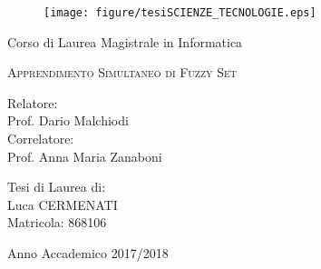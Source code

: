 \documentclass [11pt,a4paper,twoside,openright] {book}
\begin{document}
\begin{titlepage}
\begin{figure}
\centering
\texttt{[image: figure/tesiSCIENZE\_TECNOLOGIE.eps]}
\vspace{0.5 cm}
\end{figure}
\begin{center}
{\LARGE Corso di Laurea Magistrale in Informatica}
\end{center}
\begin{center}
\vspace{2 cm}
{\Large \textsc{Apprendimento Simultaneo di Fuzzy Set} }
\end{center}
\par
\vspace{2 cm}
\begin{flushleft}
Relatore:\\ Prof. Dario Malchiodi\\
\noindent Correlatore:\\ Prof. Anna Maria Zanaboni
\end{flushleft}
\vspace{1 cm}
\begin{flushright}
Tesi di Laurea di:\\ Luca CERMENATI\\ Matricola: 868106
\end{flushright} 	  
\vfill
\begin{center}
{\large Anno Accademico 2017/2018}
\end{center}
\end{titlepage}
\tableofcontents
\end{document}
